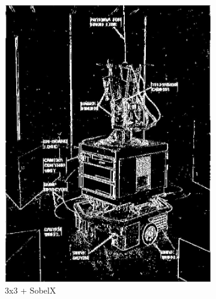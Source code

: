 \documentclass[lettersize,journal]{IEEEtran}
\begin{document}
\begin{figure}[h]
\begin{subfigure}[h]{0.155\textwidth}
        \includegraphics[width=\linewidth]{gaussian_3x3_sobelX_map}
        \caption{3x3 + SobelX}  
    \end{subfigure}
    \begin{subfigure}[h]{0.155\textwidth}
        \centering

\end{subfigure}
\end{figure}
\end{document}
